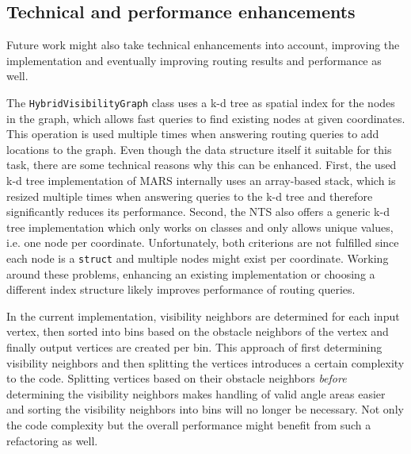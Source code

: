 	\subsection{Technical and performance enhancements}
		
		Future work might also take technical enhancements into account, improving the implementation and eventually improving routing results and performance as well.
	
		The \texttt{HybridVisibilityGraph} class uses a k-d tree as spatial index for the nodes in the graph, which allows fast queries to find existing nodes at given coordinates.
		This operation is used multiple times when answering routing queries to add locations to the graph.
		Even though the data structure itself it suitable for this task, there are some technical reasons why this can be enhanced.
		First, the used k-d tree implementation of MARS internally uses an array-based stack, which is resized multiple times when answering queries to the k-d tree and therefore significantly reduces its performance.
		Second, the NTS also offers a generic k-d tree implementation which only works on classes and only allows unique values, i.e. one node per coordinate.
		Unfortunately, both criterions are not fulfilled since each node is a \texttt{struct} and multiple nodes might exist per coordinate.
		Working around these problems, enhancing an existing implementation or choosing a different index structure likely improves performance of routing queries.
		
		In the current implementation, visibility neighbors are determined for each input vertex, then sorted into bins based on the obstacle neighbors of the vertex and finally output vertices are created per bin.
		This approach of first determining visibility neighbors and then splitting the vertices introduces a certain complexity to the code.
		Splitting vertices based on their obstacle neighbors \emph{before} determining the visibility neighbors makes handling of valid angle areas easier and sorting the visibility neighbors into bins will no longer be necessary.
		Not only the code complexity but the overall performance might benefit from such a refactoring as well.
		
